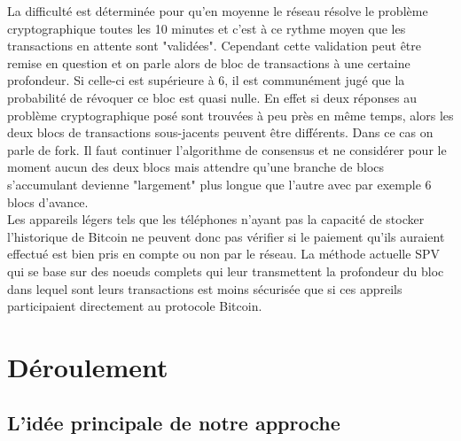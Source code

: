\documentclass[12pt,a4paper]{article}
\begin{document}
	La difficulté est déterminée pour qu'en moyenne le réseau résolve le problème cryptographique toutes les 10 minutes et c'est à ce rythme moyen que les transactions en attente sont "validées". Cependant cette validation peut être remise en question et on parle alors de bloc de transactions à une certaine profondeur. Si celle-ci est supérieure à 6, il est communément jugé que la probabilité de révoquer ce bloc est quasi nulle. En effet si deux réponses au problème cryptographique posé sont trouvées à peu près en même temps, alors les deux blocs de transactions sous-jacents peuvent être différents. Dans ce cas on parle de fork. Il faut continuer l'algorithme de consensus et ne considérer pour le moment aucun des deux blocs mais attendre qu'une branche de blocs s'accumulant devienne "largement" plus longue que l'autre avec par exemple 6 blocs d'avance.\\ %
	Les appareils légers tels que les téléphones n'ayant pas la capacité de stocker l'historique de Bitcoin ne peuvent donc pas vérifier si le paiement qu'ils auraient effectué est bien pris en compte ou non par le réseau. La méthode actuelle SPV qui se base sur des noeuds complets qui leur transmettent la profondeur du bloc dans lequel sont leurs transactions est moins sécurisée que si ces appreils participaient directement au protocole Bitcoin. %
		
	\section{Déroulement} %
	
	\subsection{L'idée principale de notre approche} %
	
\end{document}
